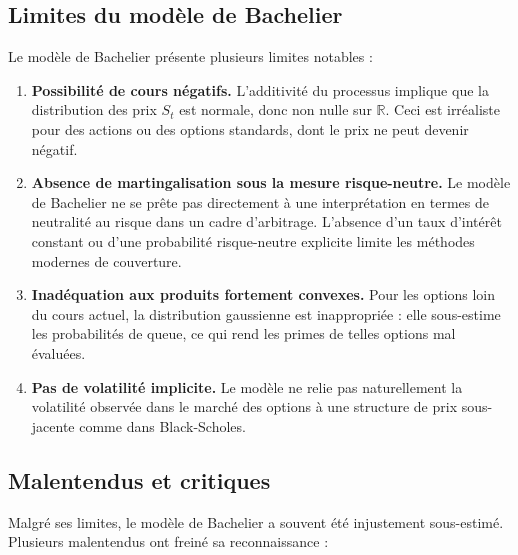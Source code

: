 \documentclass[12pt,a4paper]{article}
\begin{document}
\subsection{Limites du modèle de Bachelier}

Le modèle de Bachelier présente plusieurs limites notables :

\begin{enumerate}
    \item \textbf{Possibilité de cours négatifs.} L’additivité du processus implique que la distribution des prix $S_t$ est normale, donc non nulle sur $\mathbb{R}$. Ceci est irréaliste pour des actions ou des options standards, dont le prix ne peut devenir négatif.

    \item \textbf{Absence de martingalisation sous la mesure risque-neutre.} Le modèle de Bachelier ne se prête pas directement à une interprétation en termes de neutralité au risque dans un cadre d’arbitrage. L’absence d’un taux d’intérêt constant ou d’une probabilité risque-neutre explicite limite les méthodes modernes de couverture.

    \item \textbf{Inadéquation aux produits fortement convexes.} Pour les options loin du cours actuel, la distribution gaussienne est inappropriée : elle sous-estime les probabilités de queue, ce qui rend les primes de telles options mal évaluées.

    \item \textbf{Pas de volatilité implicite.} Le modèle ne relie pas naturellement la volatilité observée dans le marché des options à une structure de prix sous-jacente comme dans Black-Scholes.
\end{enumerate}

\subsection{Malentendus et critiques}

Malgré ses limites, le modèle de Bachelier a souvent été injustement sous-estimé. Plusieurs malentendus ont freiné sa reconnaissance :
\end{document}
